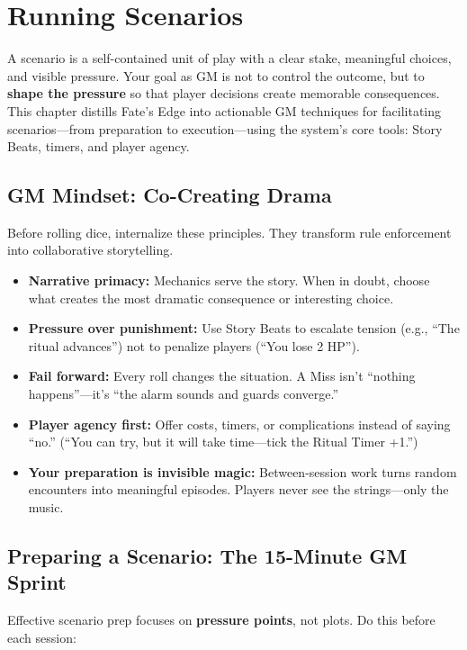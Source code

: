 \chapter{Running Scenarios}
\label{ch:running-scenarios}

A scenario is a self-contained unit of play with a clear stake, meaningful choices, and visible pressure. Your goal as GM is not to control the outcome, but to \textbf{shape the pressure} so that player decisions create memorable consequences. This chapter distills Fate's Edge into actionable GM techniques for facilitating scenarios---from preparation to execution---using the system's core tools: Story Beats, timers, and player agency.

\section{GM Mindset: Co-Creating Drama}
Before rolling dice, internalize these principles. They transform rule enforcement into collaborative storytelling.

\begin{tcolorbox}[colback=purple!5!white, colframe=purple!75!black, title=GM Core Principles,breakable]
\begin{itemize}
  \item \textbf{Narrative primacy:} Mechanics serve the story. When in doubt, choose what creates the most dramatic consequence or interesting choice.
  \item \textbf{Pressure over punishment:} Use Story Beats to escalate tension (e.g., ``The ritual advances'') not to penalize players (``You lose 2 HP'').
  \item \textbf{Fail forward:} Every roll changes the situation. A Miss isn't ``nothing happens''---it's ``the alarm sounds and guards converge.''
  \item \textbf{Player agency first:} Offer costs, timers, or complications instead of saying ``no.'' (``You can try, but it will take time---tick the Ritual Timer +1.'')
  \item \textbf{Your preparation is invisible magic:} Between-session work turns random encounters into meaningful episodes. Players never see the strings---only the music.
\end{itemize}
\end{tcolorbox}

\section{Preparing a Scenario: The 15-Minute GM Sprint}
Effective scenario prep focuses on \textbf{pressure points}, not plots. Do this before each session:

